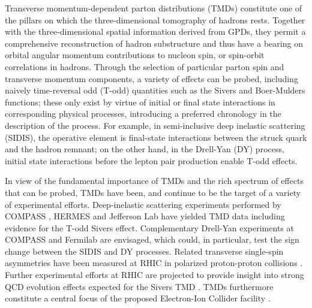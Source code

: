 

Transverse momentum-dependent parton distributions (TMDs) \cite{Boer:2011fh}
constitute one of the pillars on which the three-dimensional tomography of
hadrons rests. Together with the three-dimensional spatial information
derived from GPDs, they permit a
comprehensive reconstruction of hadron substructure and thus
have a bearing on %
orbital angular momentum contributions to nucleon spin, or
spin-orbit correlations in hadrons. Through the selection of
particular parton spin and transverse momentum components, a
variety of effects can be probed, including naively time-reversal odd
(T-odd) quantities such as the Sivers and Boer-Mulders functions;
these only exist by virtue of initial or final state interactions
in corresponding physical processes, introducing a preferred chronology
in the description of the process.
For example, in semi-inclusive
deep inelastic scattering (SIDIS), the operative element is final-state
interactions between the struck quark and the hadron remnant; on
the other hand, in the Drell-Yan (DY) process, initial state interactions
before the lepton pair production enable T-odd effects.

In view of the fundamental importance of TMDs and the rich spectrum of
effects that can be probed, TMDs have been, and continue to be the
target of a variety of experimental efforts. Deep-inelastic scattering
experiments performed by COMPASS \cite{Alekseev:2008aa,Adolph:2014fjw},
HERMES \cite{Airapetian:2009ae,Airapetian:2013bim} and Jefferson Lab
\cite{Qian:2011py,Avakian:2010ae} have yielded TMD data including evidence
for the T-odd Sivers effect. Complementary Drell-Yan experiments at
COMPASS \cite{Gautheron:2010wva} and Fermilab \cite{Brown:2014sea} are
envisaged, which could, in particular, test the sign change between
the SIDIS and DY processes. Related transverse single-spin
asymmetries have been measured at RHIC in polarized proton-proton
collisions \cite{Adare:2013ekj,Adamczyk:2012xd}. Further experimental
efforts at RHIC are projected to provide insight into strong QCD evolution
effects expected for the Sivers TMD \cite{Echevarria:2014vda}.
TMDs furthermore constitute a central focus of the proposed Electron-Ion
Collider facility \cite{Accardi:2012qut}.

